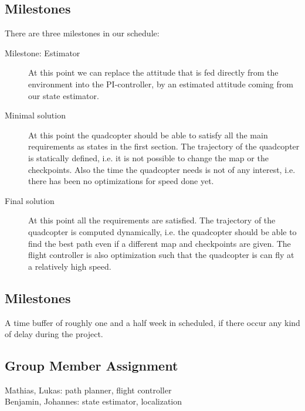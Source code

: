 \documentclass[a4paper,footsepline]{scrartcl}
\begin{document}
\subsection*{Milestones}
There are three milestones in our schedule:
\begin{description}
	\item[Milestone: Estimator] At this point we can replace the attitude that is fed directly from the environment into the PI-controller, by an estimated attitude coming from our state estimator.
	\item[Minimal solution] At this point the quadcopter should be able to satisfy all the main requirements as states in the first section. The trajectory of the quadcopter is statically defined, i.e. it is not possible to change the map or the checkpoints. Also the time the quadcopter needs is not of any interest, i.e. there has been no optimizations for speed done yet.
	\item[Final solution] At this point all the requirements are satisfied. The trajectory of the quadcopter is computed dynamically, i.e. the quadcopter should be able to find the best path even if a different map and checkpoints are given. The flight controller is also optimization such that the quadcopter is can fly at a relatively high speed.
\end{description}
\subsection*{Milestones}
A time buffer of roughly one and a half week in scheduled, if there occur any kind of delay during the project.

\subsection*{Group Member Assignment}

Mathias, Lukas:
path planner, flight controller\\

\noindent
Benjamin, Johannes:
state estimator, localization
\end{document}
